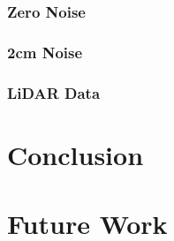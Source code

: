 \documentclass[12pt]{drexelthesis}
\let\Oldsubsection\subsection
\renewcommand{\subsection}{\FloatBarrier\Oldsubsection}
\begin{document}
\subsection{Zero Noise}
\subsection{2cm Noise}
\subsection{LiDAR Data}

\chapter{Conclusion}
\label{chap:conclusion}


\chapter{Future Work}
\label{chap:future}







\pagebreak
{}
\begin{spacing}{1.0}


\end{spacing}

\newpage
\thispagestyle{empty}

                                                                                                
\end{document}
